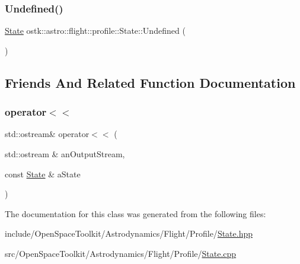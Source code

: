 \mbox{\label{classostk_1_1astro_1_1flight_1_1profile_1_1_state_af18b40557aa14bfd0b46d14ad04d33fc}} 
\subsubsection{\texorpdfstring{Undefined()}{Undefined()}}
{\footnotesize\ttfamily \hyperlink{classostk_1_1astro_1_1flight_1_1profile_1_1_state}{State} ostk\+::astro\+::flight\+::profile\+::\+State\+::\+Undefined (\begin{DoxyParamCaption}{ }\end{DoxyParamCaption})\hspace{0.3cm}{\ttfamily [static]}}



\subsection{Friends And Related Function Documentation}
\mbox{\label{classostk_1_1astro_1_1flight_1_1profile_1_1_state_abba03f039f2534d691a1dc28426e8b89}} 
\subsubsection{\texorpdfstring{operator$<$$<$}{operator<<}}
{\footnotesize\ttfamily std\+::ostream\& operator$<$$<$ (\begin{DoxyParamCaption}\item[{std\+::ostream \&}]{an\+Output\+Stream,  }\item[{const \hyperlink{classostk_1_1astro_1_1flight_1_1profile_1_1_state}{State} \&}]{a\+State }\end{DoxyParamCaption})\hspace{0.3cm}{\ttfamily [friend]}}



The documentation for this class was generated from the following files\+:\begin{DoxyCompactItemize}
\item 
include/\+Open\+Space\+Toolkit/\+Astrodynamics/\+Flight/\+Profile/\hyperlink{_flight_2_profile_2_state_8hpp}{State.\+hpp}\item 
src/\+Open\+Space\+Toolkit/\+Astrodynamics/\+Flight/\+Profile/\hyperlink{_flight_2_profile_2_state_8cpp}{State.\+cpp}\end{DoxyCompactItemize}
